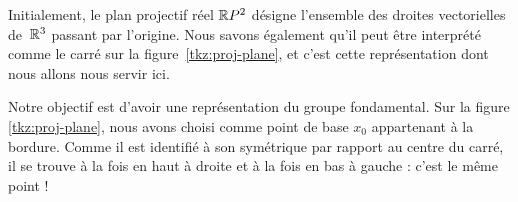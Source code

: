 \begin{exemple}
Initialement, le plan projectif réel $\mathbb{R}P^2$ désigne l'ensemble des droites vectorielles de~$\mathbb{R}^3$ passant par l'origine. Nous savons également qu'il peut être interprété comme le carré sur la figure~\ref{tkz:proj-plane}, et c'est cette représentation dont nous allons nous servir ici.


Notre objectif est d'avoir une représentation du groupe fondamental. Sur la figure \ref{tkz:proj-plane}, nous avons choisi comme point de base $x_0$ appartenant à la bordure. Comme il est identifié à son symétrique par rapport au centre du carré, il se trouve à la fois en haut à droite et à la fois en bas à gauche : c'est le même point !

\begin{figure}[H]
\centering
\begin{subfigure}[t]{0.45\textwidth}
\centering
{}
\end{subfigure}
\end{figure}
\end{exemple}
